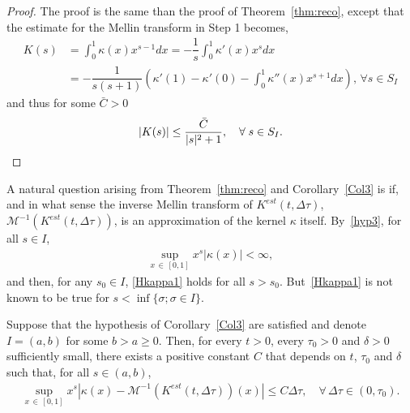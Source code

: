 \documentclass[AHL,Unicode,longabstracts,published]{cedram}
\newcommand*\dst{\displaystyle}
\newcommand*\M{\mathcal{M}}
\let\oldforall\forall
\renewcommand*{\forall}{\mathrel{\oldforall}}
\begin{document}
\begin{proof}
The proof is the same than the proof of Theorem~\ref{thm:reco}, except that the estimate for the Mellin transform in Step 1 becomes,
\begin{align*}
K(s)& = \dst\int_0^1 \kappa(x)x^{s-1} dx = -\dfrac{1}{s}\dst\int_0^1 \kappa'(x)x^{s} dx\\
& = -\dfrac{1}{s(s+1)}\left(\kappa'(1) -\kappa'(0) - \dst\int_0^1 \kappa''(x) x^{s+1} dx\right),\,\forall s\in S_I
\end{align*}
and thus for some $\bar{C}>0$
\begin{equation*}
|K(s)| \leq \dfrac{\bar{C}}{|s|^2+1},\quad\forall s\in S_I.\qedhere
\end{equation*}
\end{proof}
A natural question arising from Theorem~\ref{thm:reco} and Corollary~\ref{Col3} is if, and in what sense the inverse Mellin transform of $K^{est}(t, \Delta \tau)$, $\M^{-1}(K^{est}(t, \Delta \tau))$, is an approximation of the kernel $\kappa$ itself. By~\eqref{hyp3}, for all $s\in I$,
\begin{align}\label{Hkappa1}
\sup_{x\,\in\,[0, 1]}x^s|\kappa (x)|<\infty,
\end{align}
and then, for any $s_0\in I$, \eqref{Hkappa1} holds for all $s>s_0$. But~\eqref{Hkappa1} is not known to be true for $s<\inf\{\sigma; \sigma \in I\}$.

\begin{theo}\label{prop3}
Suppose that the hypothesis of Corollary~\ref{Col3} are satisfied and denote $I=(a, b)$ for some $b>a\ge 0$. Then, for every $t>0$, every $\tau_0 >0$ and $\delta >0$ sufficiently small, there exists a positive constant $C$ that depends on $t$, $\tau _0$ and $\delta $ such that, for all $s\in (a, b)$,
\begin{align}\label{prop3E0}
\sup_{x\,\in\,[0, 1]}x^s\left|\kappa (x)-\M^{-1}\left(K^{est}(t, \Delta \tau) \right)(x)\right|\le C\Delta \tau,\quad\forall\, \Delta \tau\in (0, \tau _0).
\end{align}
\end{theo}
\end{document}
